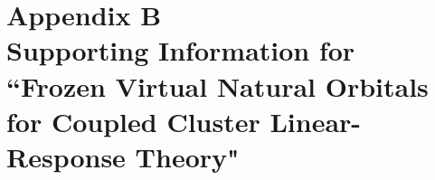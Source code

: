 \documentclass[12pt]{report}
\begin{document}
\chapter*{Appendix B \\ Supporting Information for ``Frozen Virtual Natural Orbitals for
Coupled Cluster Linear-Response Theory"}

%
%

%
%

\end{document}

